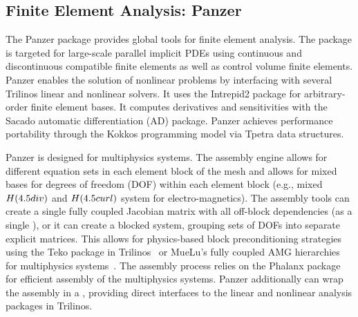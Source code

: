 \subsection{Finite Element Analysis: Panzer}
The Panzer package provides global tools for finite element analysis. The package is targeted for large-scale parallel implicit PDEs using continuous and discontinuous compatible finite elements as well as control volume finite elements. Panzer enables the solution of nonlinear problems by interfacing with several Trilinos linear and nonlinear solvers. It uses the Intrepid2 package for arbitrary-order finite element bases. It computes derivatives and sensitivities with the Sacado automatic differentiation (AD) package. Panzer achieves performance portability through the Kokkos programming model via Tpetra data structures.

Panzer is designed for multiphysics systems.
The assembly engine allows for different equation sets in each element block of the mesh and allows for mixed bases for degrees of freedom (DOF) within each element block
(e.g., mixed $H(\rm{div})$ and $H(\rm{curl})$ system for electro-magnetics).
The assembly tools can create a single fully coupled Jacobian matrix with all off-block dependencies (as a single ),
or it can create a blocked system, grouping sets of DOFs into separate explicit matrices.
This allows for physics-based block preconditioning strategies using the Teko package in Trilinos~\cite{Bonilla2023,Cyr2016a}
or MueLu's fully coupled AMG hierarchies for multiphysics systems~\cite{Ohm2022a}.
The assembly process relies on the Phalanx package for efficient assembly of the multiphysics systems.
Panzer additionally can wrap the assembly in a , providing direct interfaces to the linear and nonlinear analysis packages in Trilinos.

